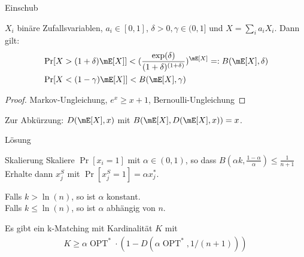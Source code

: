 \documentclass{beamer}
\DeclareMathOperator{\OPT}{OPT}
\begin{document}
\begin{frame}{Einschub}
  \begin{lemma}[Lemma 1]
    $X_{i}$ binäre Zufallsvariablen, $a_{i}\in
    [0,1]$, $\delta>0,\gamma\in (0,1]$ und $X=\sum_{i}a_{i}X_{i}$. Dann gilt:
    \begin{align*}
      &\Pr[X>(1+\delta)\mE[X]]<(\frac{\exp(\delta)}{(1+\delta)^{(1+\delta)}})^{\mE[X]}
      =:B(\mE[X],\delta)\\
      &\Pr[X<(1-\gamma)\mE[X]]<B(\mE[X],\gamma)\\
    \end{align*}
  \end{lemma}\pause
  \begin{proof}
    Markov-Ungleichung, $e^{x}\geq x+1$, Bernoulli-Ungleichung
  \end{proof}\pause
  Zur Abkürzung: $D(\mE[X],x)$ mit $B(\mE[X],D(\mE[X],x))=x$.
  
\end{frame}
\begin{frame}{Lösung}
  \begin{block}{Skalierung}
    Skaliere $\Pr[x_{i}=1]$ mit $\alpha\in (0,1)$, so dass
    $B(\alpha k,\frac{1-\alpha}{\alpha})\leq\frac{1}{n+1}$\\
    Erhalte dann $x^{S}_{j}$ mit $\Pr[x_{j}^{S}=1]=\alpha x_{j}^{*}$.
  \end{block}
  \pause
  \begin{lemma}[Lemma 2]
    Falls $k>\ln(n)$, so ist $\alpha$ konstant.\\
    Falls $k\leq \ln(n)$, so ist $\alpha$ abhängig von $n$.
  \end{lemma}\pause
  \begin{theorem}
    Es gibt ein k-Matching mit Kardinalität $K$ mit
    \begin{align*}
      K\geq \alpha\OPT^{*}\cdot (1-D(\alpha\OPT^{*},1/(n+1)))
    \end{align*}
  \end{theorem}
\end{frame}
\end{document}
